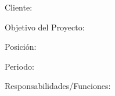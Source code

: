 \setlength{\parskip}{0pt} %
Cliente: \cliente

Objetivo del Proyecto: \objetivo

Posición: \posicion

Periodo: \periodo

Responsabilidades/Funciones:
\responsabilidades
\vspace{0.8cm}
